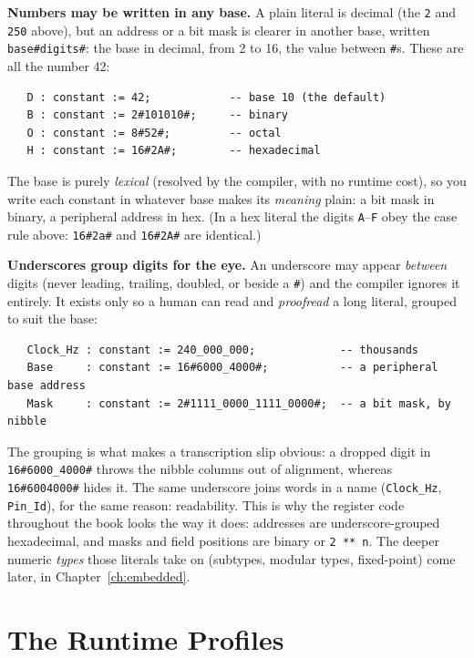 \textbf{Numbers may be written in any base.} A plain literal is decimal (the
\texttt{2} and \texttt{250} above), but an address or a bit mask is clearer in
another base, written \texttt{base\#digits\#}: the base in decimal, from 2 to 16,
the value between \texttt{\#}s. These are all the number 42:

\begin{lstlisting}
   D : constant := 42;            -- base 10 (the default)
   B : constant := 2#101010#;     -- binary
   O : constant := 8#52#;         -- octal
   H : constant := 16#2A#;        -- hexadecimal
\end{lstlisting}

The base is purely \emph{lexical} (resolved by the compiler, with no runtime cost),
so you write each constant in whatever base makes its \emph{meaning} plain: a
bit mask in binary, a peripheral address in hex. (In a hex literal the digits
\texttt{A}--\texttt{F} obey the case rule above: \texttt{16\#2a\#} and
\texttt{16\#2A\#} are identical.)

\textbf{Underscores group digits for the eye.} An underscore may appear
\emph{between} digits (never leading, trailing, doubled, or beside a \texttt{\#})
and the compiler ignores it entirely. It exists only so a human can read and
\emph{proofread} a long literal, grouped to suit the base:

\begin{lstlisting}
   Clock_Hz : constant := 240_000_000;             -- thousands
   Base     : constant := 16#6000_4000#;           -- a peripheral base address
   Mask     : constant := 2#1111_0000_1111_0000#;  -- a bit mask, by nibble
\end{lstlisting}

The grouping is what makes a transcription slip obvious: a dropped digit in
\texttt{16\#6000\_4000\#} throws the nibble columns out of alignment, whereas
\texttt{16\#6004000\#} hides it. The same underscore joins words in a name
(\texttt{Clock\_Hz}, \texttt{Pin\_Id}), for the same reason: readability. This is
why the register code throughout the book looks the way it does: addresses are
underscore-grouped hexadecimal, and masks and field positions are binary or
\texttt{2 ** n}. The deeper numeric \emph{types} those literals take on
(subtypes, modular types, fixed-point) come later, in Chapter~\ref{ch:embedded}.

\chapter{The Runtime Profiles}
\label{ch:profiles}

